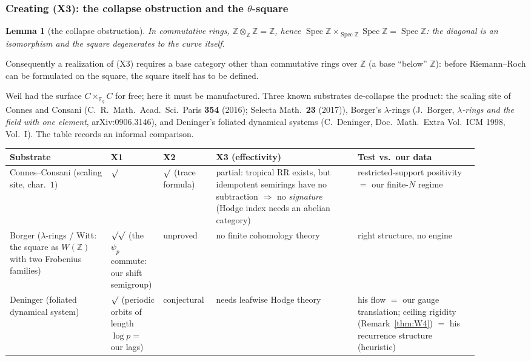 \documentclass[11pt]{amsart}
\newtheorem{lemma}[theorem]{Lemma}
\theoremstyle{definition}
\theoremstyle{remark}
\theoremstyle{definition}
\newcommand{\Z}{\mathbb{Z}}
\begin{document}
\subsubsection*{Creating (X3): the collapse obstruction and the \texorpdfstring{$\theta$}{theta}-square}

\begin{lemma}[the collapse obstruction]\label{lem:collapse}
In commutative rings, $\Z\otimes_\Z\Z=\Z$, hence
$\operatorname{Spec}\Z\times_{\operatorname{Spec}\Z}\operatorname{Spec}\Z=\operatorname{Spec}\Z$: the
diagonal is an isomorphism and the square degenerates to the curve itself.
\end{lemma}

\noindent Consequently a realization of \textnormal{(X3)} requires a base category other than
commutative rings over $\Z$ (a base ``below'' $\Z$): before Riemann--Roch can be formulated on the
square, the square itself has to be defined.

Weil had the surface $C\times_{\mathbb F_q}C$ for free; here it must be manufactured.  Three known
substrates de-collapse the product: the scaling site of Connes and Consani (C.\ R.\ Math.\ Acad.\ Sci.\
Paris \textbf{354} (2016); Selecta Math.\ \textbf{23} (2017)), Borger's $\lambda$-rings (J.~Borger,
\emph{$\lambda$-rings and the field with one element}, arXiv:0906.3146), and Deninger's foliated
dynamical systems (C.~Deninger, Doc.\ Math.\ Extra Vol.\ ICM 1998, Vol.~I).  The table records an
informal comparison.

\begin{center}\small
\begin{tabular}{@{}p{0.2\linewidth}p{0.08\linewidth}p{0.1\linewidth}p{0.28\linewidth}p{0.24\linewidth}@{}}
\toprule
Substrate & X1 & X2 & X3 (effectivity) & Test vs.\ our data \\
\midrule
Connes--Consani (scaling site, char.\ $1$) & $\surd$ & $\surd$ (trace formula) & partial: tropical
RR exists, but idempotent semirings have no subtraction $\Rightarrow$ no \emph{signature} (Hodge index
needs an abelian category) & restricted-support positivity $=$ our finite-$N$ regime \\
Borger ($\lambda$-rings / Witt: the square as $W(\Z)$ with two Frobenius families) & $\surd\surd$
(the $\psi_p$ commute: our shift semigroup) & unproved & no finite cohomology theory & right structure,
no engine \\
Deninger (foliated dynamical system) & $\surd$ (periodic orbits of length $\log p=$ our lags) &
conjectural & needs leafwise Hodge theory & his flow $=$ our gauge translation; ceiling rigidity (Remark~\ref{thm:W4}) $=$
his recurrence structure (heuristic) \\
\bottomrule
\end{tabular}
\end{center}
\end{document}
